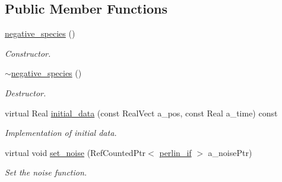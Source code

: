 \subsection*{Public Member Functions}
\begin{DoxyCompactItemize}
\item 
\hyperlink{classmorrow__lowke_1_1negative__species_af0dd68f9d6b523d90df1e4f3c726bccb}{negative\+\_\+species} ()
\begin{DoxyCompactList}\small\item\em Constructor. \end{DoxyCompactList}\item 
\hyperlink{classmorrow__lowke_1_1negative__species_a057a10525bc1ceebe0b943d2be9319e4}{$\sim$negative\+\_\+species} ()
\begin{DoxyCompactList}\small\item\em Destructor. \end{DoxyCompactList}\item 
virtual Real \hyperlink{classmorrow__lowke_1_1negative__species_a59d52adad4f2890d502ccd4ffd23bb0c}{initial\+\_\+data} (const Real\+Vect a\+\_\+pos, const Real a\+\_\+time) const 
\begin{DoxyCompactList}\small\item\em Implementation of initial data. \end{DoxyCompactList}\item 
virtual void \hyperlink{classmorrow__lowke_1_1negative__species_a8f4d560fa56515cfbf377cf5103b71b1}{set\+\_\+noise} (Ref\+Counted\+Ptr$<$ \hyperlink{classperlin__if}{perlin\+\_\+if} $>$ a\+\_\+noise\+Ptr)
\begin{DoxyCompactList}\small\item\em Set the noise function. \end{DoxyCompactList}\end{DoxyCompactItemize}
